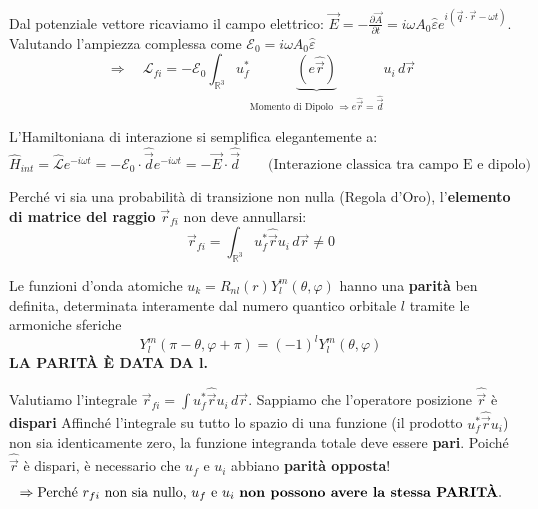 \documentclass[11pt, a4paper]{article}
\begin{document}
\noindent
Dal potenziale vettore ricaviamo il campo elettrico: $\vec{E} = -\frac{\partial \vec{A}}{\partial t} = i\omega A_0 \hat{\varepsilon} e^{i(\vec{q}\cdot\vec{r} - \omega t)}$. Valutando l'ampiezza complessa come $\mathcal{E}_0 = i\omega A_0 \hat{\varepsilon}$ %
\begin{equation}
    \Rightarrow \quad \boxed{ \mathcal{L}_{fi} = -\mathcal{E}_0 \int_{\mathbb{R}^3} u_f^* \underbrace{ (e\hat{\vec{r}}) }_{\text{Momento di Dipolo } \Rightarrow e\hat{\vec{r}} = \hat{\vec{d}}} u_i \, d\vec{r} } %
\end{equation}

L'Hamiltoniana di interazione si semplifica elegantemente a: %
\begin{equation}
    \hat{H}_{int} = \hat{\mathcal{L}} e^{-i\omega t} = -\mathcal{E}_0 \cdot \hat{\vec{d}} e^{-i\omega t} = -\vec{E} \cdot \hat{\vec{d}} \qquad \text{(Interazione classica tra campo E e dipolo)} %
\end{equation}

\noindent
Perché vi sia una probabilità di transizione non nulla (Regola d'Oro), l'\textbf{elemento di matrice del raggio} $\vec{r}_{fi}$ non deve annullarsi: %
\begin{equation}
    \vec{r}_{fi} = \int_{\mathbb{R}^3} u_f^* \hat{\vec{r}} u_i \, d\vec{r} \neq 0 %
\end{equation}

\noindent
Le funzioni d'onda atomiche $u_k = R_{nl}(r)Y_l^m(\theta,\varphi)$ hanno una \textbf{parità} ben definita, determinata interamente dal numero quantico orbitale $l$ tramite le armoniche sferiche %
\begin{equation*}
    Y_l^m(\pi - \theta, \varphi + \pi) = (-1)^l Y_l^m(\theta, \varphi) %
\end{equation*}
\textbf{LA PARITÀ È DATA DA $\mathbf{l}$.} %

\noindent
Valutiamo l'integrale $\vec{r}_{fi} = \int u_f^* \hat{\vec{r}} u_i \, d\vec{r}$. Sappiamo che l'operatore posizione $\hat{\vec{r}}$ è \textbf{dispari} %
Affinché l'integrale su tutto lo spazio di una funzione (il prodotto $u_f^* \hat{\vec{r}} u_i$) non sia identicamente zero, la funzione integranda totale deve essere \textbf{pari}. Poiché $\hat{\vec{r}}$ è dispari, è necessario che $u_f$ e $u_i$ abbiano \textbf{parità opposta}! %
\begin{equation*}
    \Rightarrow \text{Perché } r_{fi} \text{ non sia nullo, } u_f \text{ e } u_i \text{ \textbf{non possono avere la stessa PARITÀ}}. %
\end{equation*}
\end{document}
